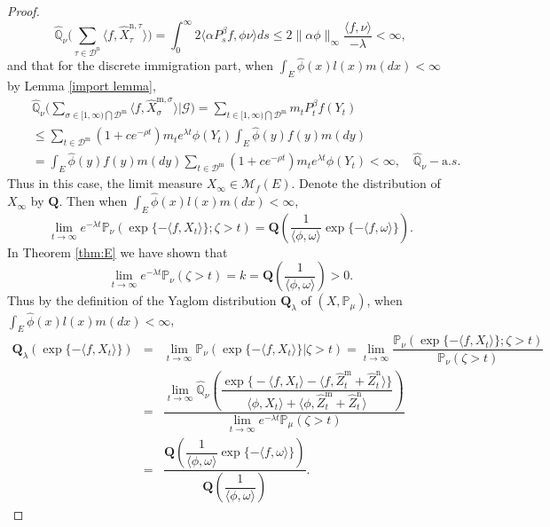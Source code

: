 \documentclass[12pt,a4paper]{amsart}
\numberwithin{equation}{section}
\theoremstyle{plain}
\theoremstyle{definition}
\theoremstyle{remark}
\begin{document}
\begin{proof}
\[
\widehat{\mathbb Q}_{\nu}\big(\sum_{\tau\in \mathcal D^{\mathrm n}}\langle f, \widehat X_{\tau}^{{\mathrm n},\tau} \rangle \big)=\int_0^\infty2\langle \alpha P^{\beta}_sf,\phi\nu\rangle ds
\leq 2\|\alpha\phi\|_\infty\dfrac{\langle f,\nu\rangle }{-\lambda}<\infty,
\]
and that for the discrete immigration part, when $\int_E\hat\phi(x)l(x)m(dx)<\infty$ by Lemma \ref{import lemma},
\begin{eqnarray*}
&&\widehat{\mathbb Q}_{\nu}\Big(\sum_{\sigma\in [1,\infty)\bigcap\mathcal D^{\mathrm m}}\langle f, \widehat X_{\sigma}^{{\mathrm m},\sigma} \rangle\Big|\mathcal G \Big)
=\sum_{t\in [1,\infty)\bigcap\mathcal D^{\mathrm m}}m_tP^{\beta}_tf( Y_t)\\
&&\leq \sum_{t\in \mathcal D^{\mathrm m}}(1+ce^{-\rho t})m_te^{\lambda t}
\phi(Y_t)\int_E\hat\phi(y)f(y)m(dy)\\
&&=\int_E\hat\phi(y)f(y)m(dy) \sum_{t\in \mathcal D^{\mathrm m}}(1+ce^{-\rho t})m_te^{\lambda t}\phi(Y_t)<\infty,\quad \widehat{\mathbb Q}_{\nu}-{\mathrm a.s.}
\end{eqnarray*}
 Thus in this case, the limit measure $X_\infty\in \mathcal M_f(E)$.  Denote the distribution of $X_\infty$ by $\mathbf Q$.  Then when $\int_E\hat\phi(x)l(x)m(dx)<\infty$,
\[
\lim_{t\rightarrow\infty}e^{-\lambda t}\mathbb P_\nu\left(\exp\{-\langle f, X_t\rangle \};\zeta>t\right)=\mathbf Q\left(\frac{1}{\langle\phi, \omega\rangle }\exp\{-\langle f, \omega\rangle \}\right).
\]
In Theorem \ref{thm:E} we have shown that
\[
\lim_{t\rightarrow\infty}e^{-\lambda t}\mathbb P_\nu(\zeta>t)=k={\mathbf Q} \left(\frac{1}{\langle\phi, \omega\rangle }\right)>0.
\]
Thus by the definition of the Yaglom distribution ${\mathbf Q}_\lambda $ of $(X,\mathbb P_\mu)$, when $\int_E\hat\phi(x)l(x)m(dx)<\infty$,
\begin{eqnarray*}
\mathbf Q_\lambda(\exp\{-\langle f, X_t\rangle \})&=&\lim_{t\rightarrow\infty}\mathbb P_\nu\left(\exp\{-\langle f, X_t\rangle \}\Big|\zeta>t\right)=\lim_{t\rightarrow\infty}\dfrac{\mathbb P_\nu\left(\exp\{-\langle f, X_t\rangle \};\zeta>t\right)}{\mathbb P_\nu(\zeta>t)}\\
&=&\dfrac{\lim_{t\rightarrow\infty}\widehat{\mathbb Q}_{\nu}\left(\dfrac{\exp\Big\{-\langle f, X_t\rangle -\langle f,  \widehat Z^{\mathrm m}_t+ \widehat Z^{\mathrm n}_t\rangle\Big \}}{\langle\phi, X_t\rangle +\langle\phi,  \widehat Z^{\mathrm m}_t+ \widehat Z^{\mathrm n}_t\rangle }
\right)}{\lim_{t\rightarrow\infty}e^{-\lambda t}\mathbb P_\mu(\zeta>t)}\\
&=&\dfrac{\mathbf Q\left(\dfrac{1}{\langle\phi, \omega\rangle }\exp\{-\langle f, \omega\rangle \}\right)}{{\mathbf Q}\left(\dfrac{1}{\langle\phi, \omega\rangle }\right)}.

\end{eqnarray*}
\end{proof}
\end{document}
